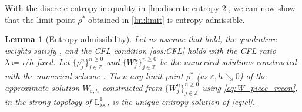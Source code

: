 \documentclass[10pt]{amsart}
\theoremstyle{plain}
\newtheorem{lemma}{Lemma}[section]
\theoremstyle{definition}
\numberwithin{equation}{section}
\newcommand{\eps}{{\varepsilon}}
\begin{document}
With the discrete entropy inequality in \cref{lm:discrete-entropy-2}, we can now show that the limit point $\rho^\ast$ obtained in \cref{lm:limit} is entropy-admissible. 

\begin{lemma}[Entropy admissibility]\label{lem:entropy_admissibility-2}
Let us assume that  hold, the quadrature weights satisfy , and the CFL condition \cref{ass:CFL} holds with the CFL ratio $\lambda\coloneqq \tau/h$ fixed. Let $\{\rho_j^n\}_{j\in\mathbb{Z}}^{n\geq0}$ and $\{W_j^n\}_{j\in\mathbb{Z}}^{n\geq0}$ be the numerical solutions constructed with the numerical scheme . Then any limit point $\rho^\ast$ (as $\eps,h \searrow 0$) of the approximate solution $W_{\eps,h}$ constructed from $\{W_j^n\}_{j\in\mathbb{Z}}^{n\geq0}$ using \cref{eq:W_piece_recon}, in the strong topology of $\mathrm{L}^1_{\mathrm{loc}}$, is the unique entropy solution of \cref{eq:cl}.
\end{lemma}
\end{document}
